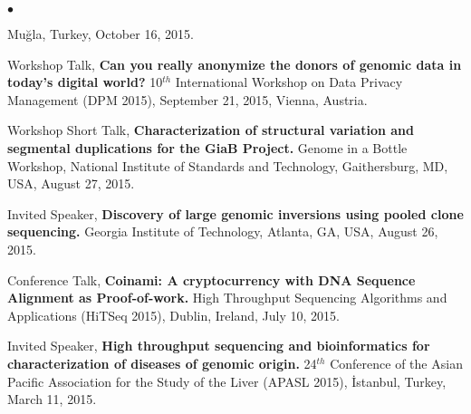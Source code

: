 \documentclass[margin,line]{res}
\newenvironment{list2}{
  \begin{list}{$\bullet$}{%
      \setlength{\itemsep}{0.1cm}
      \setlength{\parsep}{0in} \setlength{\parskip}{0in}
      \setlength{\topsep}{0in} \setlength{\partopsep}{0in} 
      \setlength{\leftmargin}{0.2in}}}{\end{list}}
\newcommand{\junk}[1]{}
\begin{document}
\begin{resume}
\begin{list2}
{   Muğla, Turkey, October 16, 2015.
 \item
  Workshop Talk, 
  {\bf Can you really anonymize the donors of genomic data in today's digital world?}
  10$^{th}$ International Workshop on Data Privacy Management (DPM 2015), 
  September 21, 2015, Vienna, Austria.
\item
  Workshop Short Talk, 
  {\bf Characterization of structural variation and segmental duplications for the GiaB Project.}
  Genome in a Bottle Workshop, National Institute of Standards and Technology, Gaithersburg, MD, USA,
  August 27, 2015.
\item
  Invited Speaker, 
  {\bf Discovery of large genomic inversions using pooled clone sequencing.}
  Georgia Institute of Technology, Atlanta, GA, USA, August 26, 2015.


\item
  Conference Talk, 
  {\bf Coinami: A cryptocurrency with DNA Sequence Alignment as Proof-of-work.}
  High Throughput Sequencing Algorithms and Applications (HiTSeq 2015), Dublin, Ireland, July 10, 2015.
}


\junk{
\item
  Invited Speaker, 
  {\bf Discovery of large genomic inversions using pooled clone sequencing.}
  İzmir Biomedicine and Genome Center, Dokuz Eylül University, İzmir, Turkey, April 20, 2015.
  
  }
  
  
\item
  Invited Speaker, 
  {\bf High throughput sequencing and bioinformatics for characterization of diseases of genomic origin.}
  24$^{th}$ Conference of the Asian Pacific Association for the Study of the Liver (APASL 2015), İstanbul, Turkey, March 11, 2015.
  
\junk{
\item
  Invited Speaker, 
  {\bf Genetik Hastalıkların Karakterizasyonunda Yüksek Ölçekli Dizileme ve Biyoenformatik.} {\it (in Turkish)},
  İzmir Biomedicine and Genome Center, Dokuz Eylül University, İzmir, Turkey, October 8, 2014

\item
  Invited Speaker, 
  {\bf Characterization of  genome structural variation and large inversions using NGS.}
  IU Bioinformatics Clinic, July 17, 2014. 

\item
  Conference Talk, 
  {\bf Characterization of large inversions using pooled clone sequencing.}
  European Molecular Biology Organization, Young Investigator Meeting, Heidelberg, Germany, May 14-16, 2014.


}
\end{list2}
\end{resume}
\end{document}
